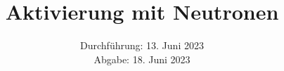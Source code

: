 

\subject{\texorpdfstring{\vspace{2ex}}{}V702\texorpdfstring{\vspace{-2ex}}{}} %
\title{Aktivierung mit Neutronen} %
\date{
	Durchführung: 13. Juni 2023 %
	\\ Abgabe: 18. Juni 2023 %
}




\maketitle
\thispagestyle{empty}


\tableofcontents
\newpage







\printbibliography{}

\newpage



